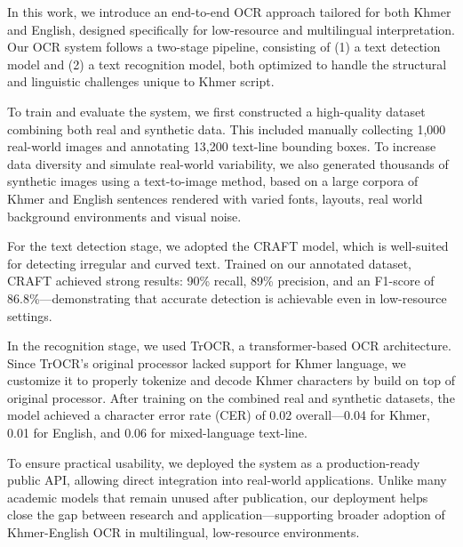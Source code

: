 \begin{adjustwidth}{0.2cm}{0.2cm}
    In this work, we introduce an end-to-end OCR approach tailored 
    for both Khmer and English, designed specifically for 
    low-resource and multilingual interpretation. Our OCR system 
    follows a two-stage pipeline, consisting of (1) a text detection 
    model and (2) a text recognition model, both optimized to handle 
    the structural and linguistic challenges unique to Khmer script.

    To train and evaluate the system, we first constructed a 
    high-quality dataset combining both real and synthetic data. 
    This included manually collecting 1,000 real-world images and 
    annotating 13,200 text-line bounding boxes. To increase data 
    diversity and simulate real-world variability, we also generated 
    thousands of synthetic images using a text-to-image method, 
    based on a large corpora of Khmer and English sentences rendered 
    with varied fonts, layouts, real world background environments 
    and visual noise.

    For the text detection stage, we adopted the CRAFT model, which 
    is well-suited for detecting irregular and curved text. Trained 
    on our annotated dataset, CRAFT achieved strong results: 90\% 
    recall, 89\% precision, and an F1-score of 86.8\%—demonstrating 
    that accurate detection is achievable even in low-resource 
    settings.

    In the recognition stage, we used TrOCR, a transformer-based 
    OCR architecture. Since TrOCR’s original processor lacked 
    support for Khmer language, we customize it to properly tokenize 
    and decode Khmer characters by build on top of original 
    processor. After training on the combined real and synthetic 
    datasets, the model achieved a character error rate (CER) of 
    0.02 overall—0.04 for Khmer, 0.01 for English, and 0.06 for 
    mixed-language text-line.

    To ensure practical usability, we deployed the system as a 
    production-ready public API, allowing direct integration into 
    real-world applications. Unlike many academic models that 
    remain unused after publication, our deployment helps close 
    the gap between research and application—supporting broader 
    adoption of Khmer-English OCR in multilingual, low-resource 
    environments.



    
    \end{adjustwidth}